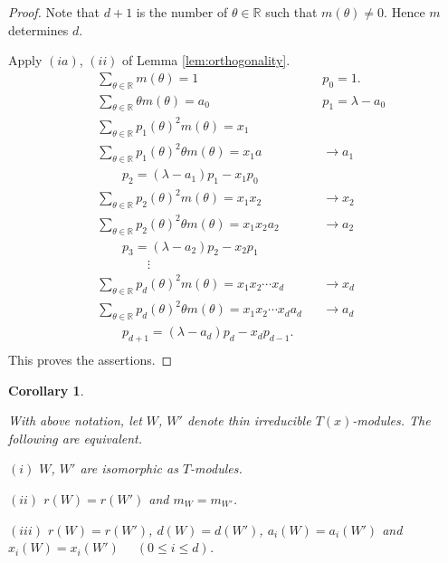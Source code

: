 \documentclass[
]{book}
\newtheorem{corollary}{Corollary}[chapter]
\theoremstyle{definition}
\theoremstyle{definition}
\theoremstyle{definition}
\theoremstyle{definition}
\theoremstyle{remark}
\begin{document}
\begin{proof}
Note that \(d+1\) is the number of \(\theta\in \mathbb{R}\) such that \(m(\theta)\neq 0\).
Hence \(m\) determines \(d\).

Apply \((ia)\), \((ii)\) of Lemma \ref{lem:orthogonality}.
\begin{align}
& \sum_{\theta\in\mathbb{R}}m(\theta) = 1 && p_0 =1.\\
& \sum_{\theta\in\mathbb{R}}\theta m(\theta) = a_0 && p_1 = \lambda - a_0\\
& \sum_{\theta\in\mathbb{R}}p_1(\theta)^2 m(\theta) = x_1 \\
& \sum_{\theta\in\mathbb{R}}p_1(\theta)^2\theta m(\theta) = x_1a && \to a_1\\
& \qquad p_2 = (\lambda - a_1)p_1 - x_1p_0\\
& \sum_{\theta\in\mathbb{R}}p_2(\theta)^2 m(\theta) = x_1x_2 && \to x_2\\
& \sum_{\theta\in\mathbb{R}}p_2(\theta)^2\theta m(\theta) = x_1x_2a_2 && \to a_2\\
& \qquad p_3 = (\lambda-a_2)p_2 - x_2p_1\\
& \qquad\qquad \vdots\\
& \sum_{\theta\in\mathbb{R}}p_d(\theta)^2 m(\theta) = x_1x_2\cdots x_d && \to x_d\\
& \sum_{\theta\in\mathbb{R}}p_d(\theta)^2\theta m(\theta) = x_1x_2\cdots x_da_d && \to a_d\\
& \qquad p_{d+1} = (\lambda-a_d)p_d - x_dp_{d-1}.\\
\end{align}
This proves the assertions.
\end{proof}

\begin{corollary}
\protect\hypertarget{cor:isomorphic}{}\label{cor:isomorphic}

With above notation, let
\(W\), \(W'\) denote thin irreducible \(T(x)\)-modules. The following are equivalent.

\((i)\) \(W\), \(W'\) are isomorphic as \(T\)-modules.

\((ii)\) \(r(W) = r(W')\) and \(m_W = m_{W'}\).

\((iii)\) \(r(W) = r(W')\), \(d(W) = d(W')\), \(a_i(W) = a_i(W')\) and \(x_i(W) = x_i(W')\) \(\quad (0\leq i\leq d)\).

\end{corollary}
\end{document}
